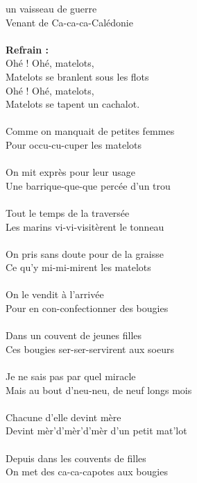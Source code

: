 
 un vaisseau de guerre ~~~~~~ \bissimple
\\Venant de Ca-ca-ca-Calédonie ~~~ \bissimple
\\\\\textbf{Refrain :}
\\Ohé ! Ohé, matelots, 
\\Matelots se branlent sous les flots  
\\Ohé ! Ohé, matelots,  
\\Matelots se tapent un cachalot. 
\\\\Comme on manquait de petites femmes \bissimple
\\Pour occu-cu-cuper les matelots ~~~~~~~~~ \bissimple
\\\\On mit exprès pour leur usage  ~~~~~~~~~~~~\bissimple
\\Une barrique-que-que percée d'un trou ~\bissimple
\\\\Tout le temps de la traversée ~~~~~~~~~~~~ \bissimple
\\Les marins vi-vi-visitèrent le tonneau ~~ \bissimple
\\\\On pris sans doute pour de la graisse  ~~ \bissimple
\\Ce qu'y mi-mi-mirent les matelots ~~~~~~ \bissimple
\\\\On le vendit à l'arrivée ~~~~~~~~~~~~~~~~~~~~~~ \bissimple
\\Pour en con-confectionner des bougies ~~~ \bissimple
\\\\Dans un couvent de jeunes filles ~~~~~~~~~~ \bissimple
\\Ces bougies ser-ser-servirent aux soeurs ~ \bissimple
\\\\Je ne sais pas par quel miracle ~~~~~~~~~~~~~~~~~ \bissimple
\\Mais au bout d'neu-neu, de neuf longs mois ~ \bissimple
\\\\Chacune d'elle devint mère ~~~~~~~~~~~~~~~~~~~~~\bissimple
\\Devint mèr'd'mèr'd'mèr d'un petit mat’lot ~\bissimple
\\\\Depuis dans les couvents de filles ~~~~~~~~ \bissimple
\\On met des ca-ca-capotes aux bougies ~ \bissimple
\breakpage